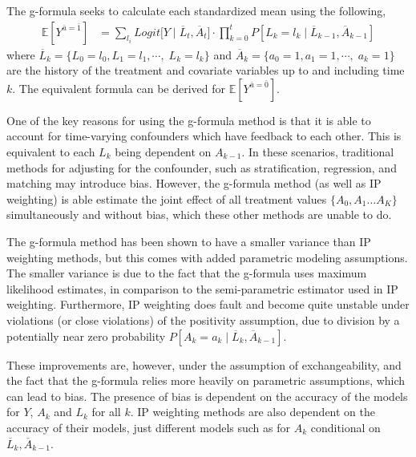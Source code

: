 The g-formula seeks to calculate each standardized mean using the following, 
\begin{align} \label{eq:3} 
\mathbb{E}[Y^{\bar{a}= \bar{1}}] &= \sum_{l_i} Logit \big[Y \mid  \overline{L}_{t}, \overline{A}_{t} \big]\cdot \prod_{k=0}^t P[L_k = l_k \mid \overline{L}_{k-1}, \overline{A}_{k-1}]
\end{align}
where $\overline{L}_k = \{L_{0} = l_0, L_{1} = l_1,  \cdots, \; L_{k} = l_k\}$ and $\overline{A}_k = \{a_{0} = 1, a_{1} = 1,  \cdots, \; a_{k} = 1\}$ are the history of the treatment and covariate variables up to and including time $k$.  The equivalent formula can be derived for $ \mathbb{E}[Y^{\bar{a} = \bar{0}}]$.   


One of the key reasons for using the g-formula method is that it is able to account for time-varying confounders which have feedback to each other.  This is equivalent to each $L_k$ being dependent on $A_{k-1}$.\cite{robins1986new}  In these scenarios, traditional methods for adjusting for the confounder, such as stratification, regression, and matching may introduce bias. However, the g-formula method (as well as IP weighting) is able estimate the joint effect of all treatment values $\{A_0, A_1 \dots A_K \}$ simultaneously and without bias, which these other methods are unable to do.\cite{fitzmaurice2008longitudinal, wright2015international}  

The g-formula method has been shown to have a smaller variance than IP weighting methods, but this comes with added parametric modeling assumptions.\cite{young2011comparative} The smaller variance is due to the fact that the g-formula uses maximum likelihood estimates, in comparison to the semi-parametric estimator used in IP weighting. Furthermore, IP weighting does fault and become quite unstable under violations (or close violations) of the positivity assumption, due to division by a potentially near zero probability $P[A_k=a_k \mid \overline{L}_k, \overline{A}_{k-1}]$.  

These improvements are, however, under the assumption of exchangeability, and the fact that the g-formula relies more heavily on parametric assumptions, which can lead to bias.  The presence of bias is dependent on the accuracy of the models for $Y$, $A_k$ and $L_k$ for all $k$.  IP weighting methods are also dependent on the accuracy of their models, just different models such as for $A_k$ conditional on $\overline{L}_k, \overline{A}_{k-1}$.  


